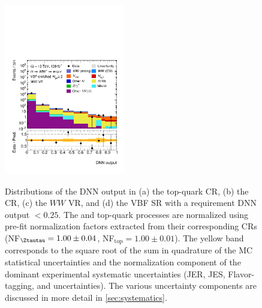 \begin{figure}[ht]
{        \includegraphics[width=0.47\textwidth]{figures/220605-Thesis/wwvr/dnn/plots/run2-emme-CutVBF_WWControl_2jet-DNNoutputG_Fit_finelowDNN2-log}
        \label{fig:dnn:dnn-val-in-crs-c}
    }
    {\caption{Distributions of the DNN output in (a) the top-quark CR, (b) the \Ztautau CR, (c) the $WW$ VR, and (d) the VBF SR with a requirement DNN output $<0.25$. The \Ztautau and top-quark processes are normalized using pre-fit normalization factors extracted from their corresponding CRs (NF$_{\Ztautau} = 1.00 \pm 0.04$, NF$_{\text{top}} = 1.00 \pm 0.01$). The yellow band corresponds to the square root of the sum in quadrature of the MC statistical uncertainties and the normalization component of the dominant experimental systematic uncertainties (JER, JES, Flavor-tagging, and \MET uncertainties). The various uncertainty components are discussed in more detail in \cref{sec:systematics}.
            \label{fig:dnn:dnn-val-in-crs} }}
\end{figure}
